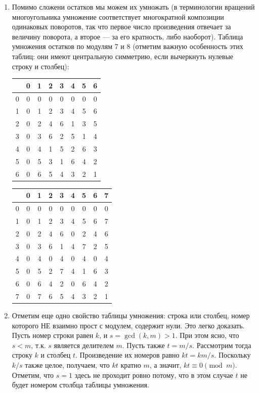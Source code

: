 \begin{enumerate}
\item Помимо сложени остатков мы можем их умножать (в терминологии вращений многоугольника умножение соответствует многократной композиции одинаковых поворотов, так что первое число произведения отвечает за величину поворота, а второе --- за его кратность, либо наоборот).  Таблица умножения остатков по модулям 7 и 8 (отметим важную особенность этих таблиц: они имеют центральную симметрию, если вычеркнуть нулевые строку и столбец):
\begin{center}
\begin{tabular}{c||c||c|c|c|c|c|c|}
  & 0 & 1 & 2 & 3 & 4 & 5 & 6 \\ \hline\hline
0 & 0 & 0 & 0 & 0 & 0 & 0 & 0 \\ \hline\hline
1 & 0 & 1 & 2 & 3 & 4 & 5 & 6 \\ \hline
2 & 0 & 2 & 4 & 6 & 1 & 3 & 5 \\ \hline
3 & 0 & 3 & 6 & 2 & 5 & 1 & 4 \\ \hline
4 & 0 & 4 & 1 & 5 & 2 & 6 & 3 \\ \hline
5 & 0 & 5 & 3 & 1 & 6 & 4 & 2 \\ \hline
6 & 0 & 6 & 5 & 4 & 3 & 2 & 1 \\ \hline
\end{tabular}
\qquad
\begin{tabular}{c||c||c|c|c|c|c|c|c|}
  & 0 & 1 & 2 & 3 & 4 & 5 & 6 & 7 \\ \hline\hline
0 & 0 & 0 & 0 & 0 & 0 & 0 & 0 & 0 \\ \hline\hline
1 & 0 & 1 & 2 & 3 & 4 & 5 & 6 & 7 \\ \hline
2 & 0 & 2 & 4 & 6 & 0 & 2 & 4 & 6 \\ \hline
3 & 0 & 3 & 6 & 1 & 4 & 7 & 2 & 5 \\ \hline
4 & 0 & 4 & 0 & 4 & 0 & 4 & 0 & 4 \\ \hline
5 & 0 & 5 & 2 & 7 & 4 & 1 & 6 & 3 \\ \hline
6 & 0 & 6 & 4 & 2 & 0 & 6 & 4 & 2 \\ \hline
7 & 0 & 7 & 6 & 5 & 4 & 3 & 2 & 1 \\ \hline
\end{tabular}
\end{center}
\item Отметим еще одно свойство таблицы умножения: строка или столбец, номер которого НЕ взаимно прост с модулем, содержит нули. Это легко доказать. Пусть номер строки равен $k$, и $s=\gcd(k,m)>1$. При этом ясно, что $s<m$, т.к. $s$ является делителем $m$. Пусть также $t=m/s$. Рассмотрим тогда строку $k$ и столбец $t$. Произведение их номеров равно $kt=km/s$. Поскольку $k/s$ также целое, получаем, что $kt$ кратно $m$, а значит, $kt\equiv 0\pmod m$. Отметим, что $s=1$ здесь не проходит ровно потому, что в этом случае $t$ не будет номером столбца таблицы умножения.

\end{enumerate}
